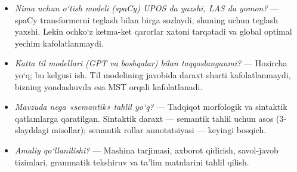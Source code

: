 \documentclass[14pt,a4paper]{extarticle}
\begin{document}
\begin{itemize}
        ta’limiy matnlar uchun ilk bor» deyman; UzUDT --- hozirda eng katta ochiq o‘zbek UD korpusi.
        Ikki korpusni birlashtirib o‘qitish va graf/o‘tish usullarini bir xil test to‘plamida taqqoslash
        esa UzUDT e’lon qilingandan keyingina mumkin bo‘ldi --- buni birinchi bo‘lib men bajardim.
  \item \textit{Nima uchun o‘tish modeli (spaCy) UPOS da yaxshi, LAS da yomon?} --- spaCy transformerni
        teglash bilan birga sozlaydi, shuning uchun teglash yaxshi. Lekin ochko‘z ketma-ket qarorlar
        xatoni tarqatadi va global optimal yechim kafolatlanmaydi.
  \item \textit{Katta til modellari (GPT va boshqalar) bilan taqqoslanganmi?} --- Hozircha yo‘q; bu
        kelgusi ish. Til modelining javobida daraxt sharti kafolatlanmaydi, bizning yondashuvda esa MST
        orqali kafolatlanadi.
  \item \textit{Mavzuda nega «semantik» tahlil yo‘q?} --- Tadqiqot morfologik va sintaktik qatlamlarga
        qaratilgan. Sintaktik daraxt --- semantik tahlil uchun asos (3-slayddagi misollar); semantik
        rollar annotatsiyasi --- keyingi bosqich.
  \item \textit{Amaliy qo‘llanilishi?} --- Mashina tarjimasi, axborot qidirish, savol-javob tizimlari,
        grammatik tekshiruv va ta’lim matnlarini tahlil qilish.
\end{itemize}
\end{document}
